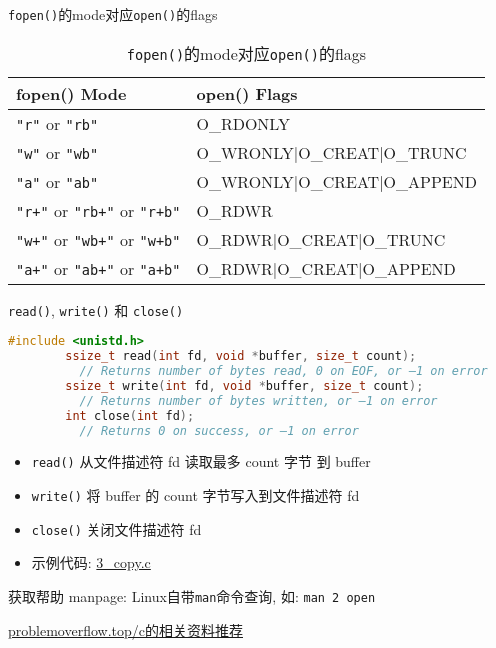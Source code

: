 \begin{frame}[fragile]{\texttt{fopen()}的mode对应\texttt{open()}的flags}
    \begin{table}[]
        \begin{tabular}{|l|l|}
            \hline
            fopen() Mode & open() Flags \\ \hline
            \texttt{"r"} or  \texttt{"rb"} & O\_RDONLY \\ \hline
            \texttt{"w"} or  \texttt{"wb"} & O\_WRONLY|O\_CREAT|O\_TRUNC \\ \hline
            \texttt{"a"} or  \texttt{"ab"} & O\_WRONLY|O\_CREAT|O\_APPEND \\ \hline
            \texttt{"r+"}  or \texttt{"rb+"} or \texttt{"r+b"} & O\_RDWR \\ \hline
            \texttt{"w+"}  or \texttt{"wb+"} or \texttt{"w+b"} & O\_RDWR|O\_CREAT|O\_TRUNC \\ \hline
            \texttt{"a+"}  or \texttt{"ab+"} or \texttt{"a+b"} & O\_RDWR|O\_CREAT|O\_APPEND \\ \hline
        \end{tabular}
        \caption{\texttt{fopen()}的mode对应\texttt{open()}的flags}
    \end{table}
\end{frame}

\begin{frame}[fragile]{\texttt{read()}, \texttt{write()} 和 \texttt{close()}}
    \scriptsize
    \begin{lstlisting}[language=c]
        #include <unistd.h>
        ssize_t read(int fd, void *buffer, size_t count);
          // Returns number of bytes read, 0 on EOF, or –1 on error
        ssize_t write(int fd, void *buffer, size_t count);
          // Returns number of bytes written, or –1 on error
        int close(int fd);
          // Returns 0 on success, or –1 on error
    \end{lstlisting}
    \small
    \begin{itemize}[<+- | alert@+>]
        \item \texttt{read()} 从文件描述符 fd 读取最多 count 字节 到 buffer
        \item \texttt{write()} 将 buffer 的 count 字节写入到文件描述符 fd
        \item \texttt{close()} 关闭文件描述符 fd
        \item 示例代码: \href{http://problemoverflow.top/download/io.zip}{3\_copy.c}
    \end{itemize}
\end{frame}

\begin{frame}[fragile]{获取帮助}
    manpage: Linux自带\texttt{man}命令查询, 如: \texttt{man 2 open}

    \href{http://problemoverflow.top/c/index.html#\%E7\%9B\%B8\%E5\%85\%B3\%E4\%B9\%A6\%E7\%B1\%8D\%E8\%B5\%84\%E6\%96\%99\%E6\%8E\%A8\%E8\%8D\%90}{problemoverflow.top/c的相关资料推荐}
\end{frame}